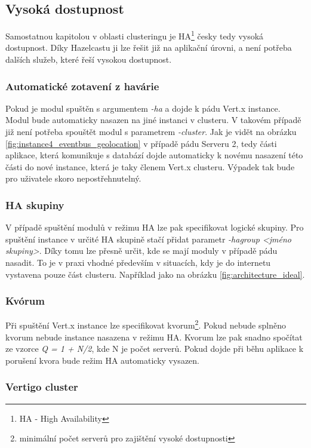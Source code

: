 \subsection{Vysoká dostupnost}

Samostatnou kapitolou v oblasti clusteringu je HA\footnote{HA - High Availability} česky tedy vysoká dostupnost. Díky Hazelcastu ji lze řešit již na aplikační úrovni, a není potřeba  dalších služeb, které řeší vysokou dostupnost.

\subsubsection{Automatické zotavení z havárie}

Pokud je modul spuštěn s argumentem \emph{-ha} a dojde k pádu Vert.x instance. Modul bude automaticky nasazen na jiné instanci v clusteru. V takovém případě již není potřeba spouštět modul s parametrem \emph{-cluster}. Jak je vidět na obrázku \ref{fig:instance4_eventbus_geolocation} v případě pádu Serveru 2, tedy části aplikace, která komunikuje s databází dojde automaticky k novému nasazení této části do nové instance, která je taky členem Vert.x clusteru. Výpadek tak bude pro uživatele skoro nepostřehnutelný.

\subsubsection{HA skupiny}

V případě spuštění modulů v režimu HA lze pak specifikovat logické skupiny. Pro spuštění instance v určité HA skupině stačí přidat parametr \emph{-hagroup <jméno skupiny>}. Díky tomu lze přesně určit, kde se mají moduly v případě pádu nasadit. To je v praxi vhodné především v situacích, kdy je do internetu vystavena pouze část clusteru. Například jako na obrázku \ref{fig:architecture_ideal}.

\subsubsection{Kvórum}

Při spuštění Vert.x instance lze specifikovat kvorum\footnote{minimální počet serverů pro zajištění vysoké dostupnosti}. Pokud nebude splněno kvorum nebude instance nasazena v režimu HA. Kvorum lze pak snadno spočítat ze vzorce \emph{Q = 1 + N/2}, kde N je počet serverů. Pokud dojde při běhu aplikace k porušení kvora bude režim HA automaticky vysazen.

\subsubsection{Vertigo cluster}

